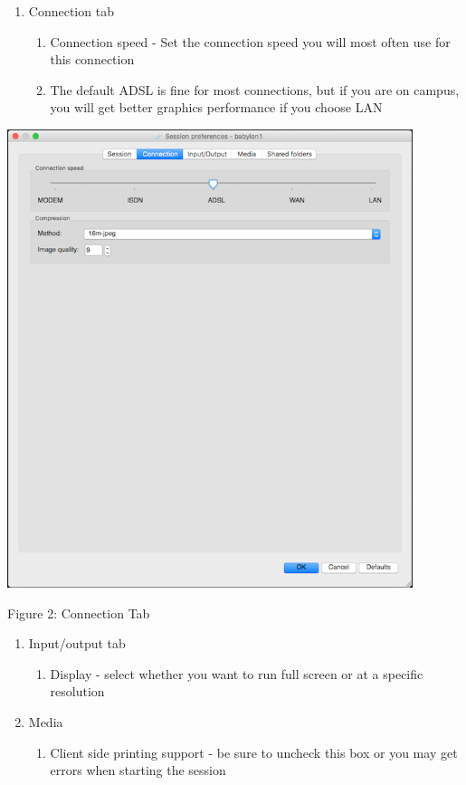 \documentclass[
]{article}
\begin{document}
\begin{enumerate}
\def\labelenumi{\arabic{enumi}.}
\setcounter{enumi}{5}
\item
  Connection tab

  \begin{enumerate}
  \def\labelenumii{\arabic{enumii}.}
  \item
    Connection speed - Set the connection speed you will most often use
    for this connection
  \item
    The default ADSL is fine for most connections, but if you are on
    campus, you will get better graphics performance if you choose LAN
  \end{enumerate}
\end{enumerate}

\includegraphics[width=4.66535in,height=5.27165in]{images/media/image2.png}

Figure 2: Connection Tab

\begin{enumerate}
\def\labelenumi{\arabic{enumi}.}
\setcounter{enumi}{6}
\item
  Input/output tab

  \begin{enumerate}
  \def\labelenumii{\arabic{enumii}.}
  \item
    Display - select whether you want to run full screen or at a
    specific resolution
  \end{enumerate}
\item
  Media

  \begin{enumerate}
  \def\labelenumii{\arabic{enumii}.}
  \item
    Client side printing support - be sure to uncheck this box or you
    may get errors when starting the session
  \end{enumerate}
\end{enumerate}
\end{document}
